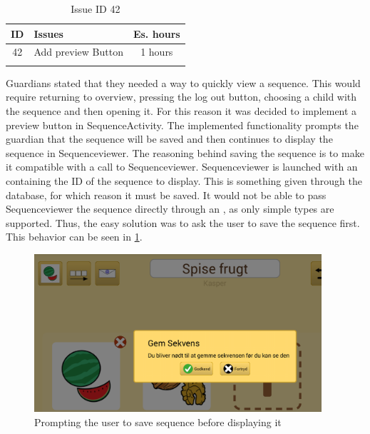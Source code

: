 \begin{longtable} { | c | p{12cm} | c | } 
\hline
	ID 	&	Issues	&		 Es. hours \\\hline
	42	&	Add preview Button	&	1 hours	\\\hline
\caption{Issue ID 42}
\label{tab:spr4_previewButton}
\end{longtable}

Guardians stated that they needed a way to quickly view a sequence. This would require returning to overview, pressing the log out button, choosing a child with the sequence and then opening it. For this reason it was decided to implement a preview button in SequenceActivity. The implemented functionality prompts the guardian that the sequence will be saved and then continues to display the sequence in Sequenceviewer. The reasoning behind saving the sequence is to make it compatible with a call to Sequenceviewer. Sequenceviewer is launched with an  containing the ID of the sequence to display. This is something given through the database, for which reason it must be saved. It would not be able to pass Sequenceviewer the sequence directly through an , as only simple types are supported. Thus, the easy solution was to ask the user to save the sequence first. This behavior can be seen in \ref{fig:savebeforepreview}.

\begin{figure}[H]
	\centering
	\includegraphics[width=0.95\textwidth]{Pics/Sprint4/savebeforepreview.png}
	\caption{Prompting the user to save sequence before displaying it}
	\label{fig:savebeforepreview}
\end{figure}